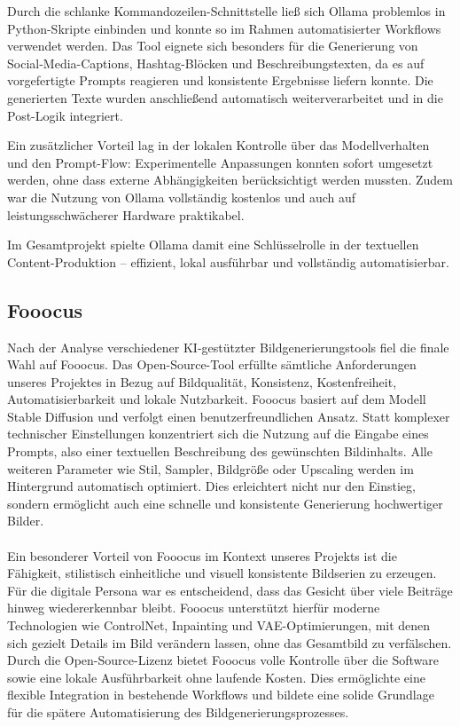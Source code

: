 \documentclass[a4paper,12pt]{article}
\begin{document}
Durch die schlanke Kommandozeilen-Schnittstelle ließ sich Ollama problemlos in Python-Skripte einbinden und konnte so im Rahmen automatisierter Workflows verwendet werden. Das Tool eignete sich besonders für die Generierung von Social-Media-Captions, Hashtag-Blöcken und Beschreibungstexten, da es auf vorgefertigte Prompts reagieren und konsistente Ergebnisse liefern konnte. Die generierten Texte wurden anschließend automatisch weiterverarbeitet und in die Post-Logik integriert.

Ein zusätzlicher Vorteil lag in der lokalen Kontrolle über das Modellverhalten und den Prompt-Flow: Experimentelle Anpassungen konnten sofort umgesetzt werden, ohne dass externe Abhängigkeiten berücksichtigt werden mussten. Zudem war die Nutzung von Ollama vollständig kostenlos und auch auf leistungsschwächerer Hardware praktikabel.

Im Gesamtprojekt spielte Ollama damit eine Schlüsselrolle in der textuellen Content-Produktion – effizient, lokal ausführbar und vollständig automatisierbar.

\subsection{Fooocus}

Nach der Analyse verschiedener KI-gestützter Bildgenerierungstools fiel die finale Wahl auf Fooocus. Das Open-Source-Tool erfüllte sämtliche Anforderungen unseres Projektes in Bezug auf Bildqualität, Konsistenz, Kostenfreiheit, Automatisierbarkeit und lokale Nutzbarkeit.
Fooocus basiert auf dem Modell Stable Diffusion und verfolgt einen benutzerfreundlichen Ansatz. Statt komplexer technischer Einstellungen konzentriert sich die Nutzung auf die Eingabe eines Prompts, also einer textuellen Beschreibung des gewünschten Bildinhalts. Alle weiteren Parameter wie Stil, Sampler, Bildgröße oder Upscaling werden im Hintergrund automatisch optimiert. Dies erleichtert nicht nur den Einstieg, sondern ermöglicht auch eine schnelle und konsistente Generierung hochwertiger Bilder. \\\\
Ein besonderer Vorteil von Fooocus im Kontext unseres Projekts ist die Fähigkeit, stilistisch einheitliche und visuell konsistente Bildserien zu erzeugen. Für die digitale Persona war es entscheidend, dass das Gesicht über viele Beiträge hinweg wiedererkennbar bleibt. Fooocus unterstützt hierfür moderne Technologien wie ControlNet, Inpainting und VAE-Optimierungen, mit denen sich gezielt Details im Bild verändern lassen, ohne das Gesamtbild zu verfälschen.
Durch die Open-Source-Lizenz bietet Fooocus volle Kontrolle über die Software sowie eine lokale Ausführbarkeit ohne laufende Kosten. Dies ermöglichte eine flexible Integration in bestehende Workflows und bildete eine solide Grundlage für die spätere Automatisierung des Bildgenerierungsprozesses.
\end{document}
